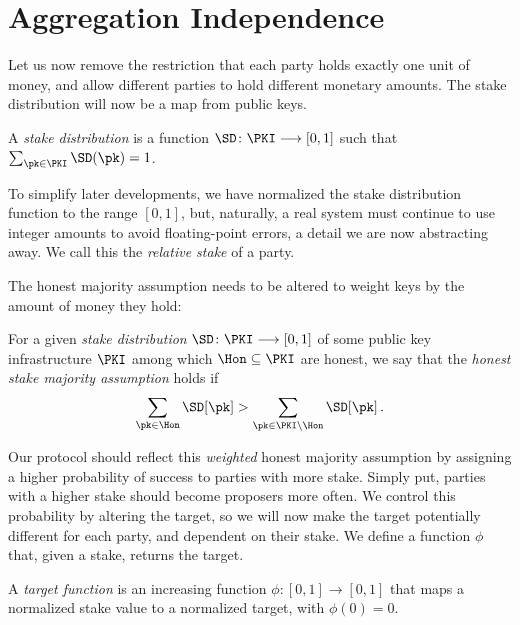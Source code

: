 \section{Aggregation Independence}

Let us now remove the restriction that each party holds exactly one unit of money,
and allow different parties to hold different monetary amounts. The stake distribution
will now be a map from public keys.

\begin{definition}
  A \emph{stake distribution} is a function $\SD\colon \PKI \longrightarrow [0, 1]$
  such that $\sum_{\pk \in \PKI} \SD(\pk) = 1$.
\end{definition}

To simplify later developments, we have normalized the stake distribution function
to the range $[0, 1]$, but, naturally, a real system must continue to use integer amounts
to avoid floating-point errors, a detail we are now abstracting away. We call this the
\emph{relative stake} of a party.

The honest majority
assumption needs to be altered to weight keys by the amount of money they hold:

\begin{definition}
  For a given \emph{stake distribution} $\SD\colon \PKI \longrightarrow [0, 1]$
  of some public key infrastructure $\PKI$ among which $\Hon \subseteq \PKI$ are honest, we say
  that the \emph{honest stake majority assumption} holds if
  \[
    \sum_{\pk \in \Hon} \SD[\pk] > \sum_{\pk \in \PKI \setminus \Hon} \SD[\pk]\,.
  \]
\end{definition}

Our protocol should reflect this \emph{weighted} honest majority assumption by assigning
a higher probability of success to parties with more stake. Simply put, parties with
a higher stake should become proposers more often. We control this probability by altering
the target, so we will now make the target potentially different for each party, and
dependent on their stake. We define a function $\phi$ that, given a stake, returns
the target.


\begin{definition}
  A \emph{target function} is an increasing function $\phi\colon [0, 1] \longrightarrow [0, 1]$ that maps
  a normalized stake value to a normalized target, with $\phi(0) = 0$.
\end{definition}

